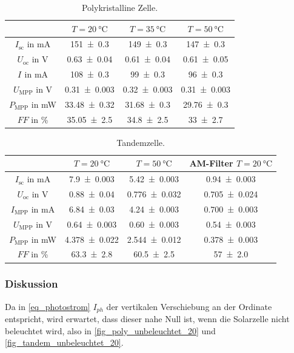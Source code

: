 \documentclass[
	a4paper,
	12pt,
	pagesize,
	ngerman
]{scrartcl}
\begin{document}
\begin{table}[H]
		\centering
		\begin{tabular}{c | c | c | c  }
			 &$T=\SI{20}{\celsius}$& $T=\SI{35}{\celsius}$& $T=\SI{50}{\celsius}$ \\ \hline
			 $I_\text{sc}$ in \si{mA}& \SI{151+-0.3}{}&\SI{149+-0.3}{}& \SI{147+-0.3}{} \\
			 $U_\text{oc}$ in \si{V}&\SI{0.63+-0.04}{}&\SI{0.61+-0.04}{}&\SI{0.61+-0.05}{} \\
			 $I_\text{}$ in \si{mA}&\SI{108+-0.3}{}&\SI{99+-0.3}{}&\SI{96+-0.3}{} \\
			 $U_\text{MPP}$ in \si{V}&\SI{0.31+-0.003}{}&\SI{0.32+-0.003}{}&\SI{0.31+-0.003}{} \\
			 $P_\text{MPP}$ in \si{mW}&\SI{33.48+-0.32}{}&\SI{31.68+-0.3}{}&\SI{29.76+-0.3}{} \\
			 $FF$ in \si{\percent}&\SI{35.05+-2.5}{}&\SI{34.8+-2.5}{}&\SI{33+-2.7}{} \\
		\end{tabular}
		\caption{
		Polykristalline Zelle.
		}
		\label{tb_solar_param_poly}
\end{table}

\begin{table}[H]
		\centering
		\begin{tabular}{c | c | c | c  }
			 &$T=\SI{20}{\celsius}$& $T=\SI{50}{\celsius}$& AM-Filter $T=\SI{20}{\celsius}$ \\ \hline
			 $I_\text{sc}$ in \si{mA}& \SI{7.9+-0.003}{}&\SI{5.42+-0.003}{}& \SI{0.94+-0.003}{} \\
			 $U_\text{oc}$ in \si{V}&\SI{0.88+-0.04}{}&\SI{0.776+-0.032}{}&\SI{0.705+-0.024}{} \\
			 $I_\text{MPP}$ in \si{mA}&\SI{6.84+-0.03}{}&\SI{4.24+-0.003}{}&\SI{0.700+-0.003}{} \\
			 $U_\text{MPP}$ in \si{V}&\SI{0.64+-0.003}{}&\SI{0.60+-0.003}{}&\SI{0.54+-0.003}{} \\
			 $P_\text{MPP}$ in \si{mW}&\SI{4.378+-0.022}{}&\SI{2.544+-0.012}{}&\SI{0.378+-0.003}{} \\
			 $FF$ in \si{\percent}&\SI{63.3+-2.8}{}&\SI{60.5+-2.5}{}&\SI{57+-2.0}{} \\
		\end{tabular}
		\caption{
		Tandemzelle.
		}
		\label{tb_solar_param_tandem}
\end{table}
	\subsubsection{Diskussion}
	Da in \cref{eq_photostrom} $I_{ph}$ der vertikalen Verschiebung an der Ordinate entspricht, wird erwartet, dass dieser nahe Null ist, wenn die Solarzelle nicht beleuchtet wird, also in \cref{fig_poly_unbeleuchtet_20} und \cref{fig_tandem_unbeleuchtet_20}.
\end{document}
